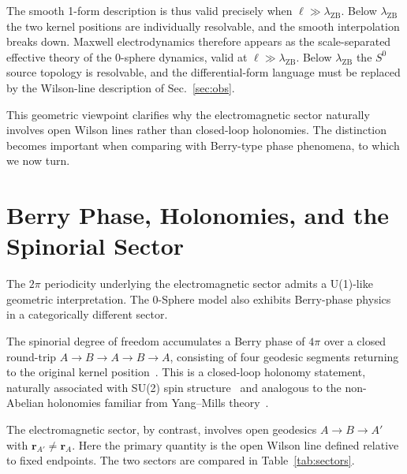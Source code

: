 \documentclass[%
 reprint, amsmath,amssymb, aps, prb, ]{revtex4-2}
\numberwithin{equation}{section}
\begin{document}
The smooth 1-form description is thus valid precisely when $\ell\gg\lambda_{\text{ZB}}$. Below $\lambda_{\text{ZB}}$ the two kernel positions are individually resolvable, and the smooth interpolation breaks down. Maxwell electrodynamics therefore appears as the scale-separated effective theory of the 0-sphere dynamics, valid at $\ell\gg\lambda_{\text{ZB}}$. Below $\lambda_{\text{ZB}}$ the $S^0$ source topology is resolvable, and the differential-form language must be replaced by the Wilson-line description of Sec.~\ref{sec:obs}.

This geometric viewpoint clarifies why the electromagnetic sector naturally involves open Wilson lines rather than closed-loop holonomies. The distinction becomes important when comparing with Berry-type phase phenomena, to which we now turn.

\section{Berry Phase, Holonomies, and the Spinorial Sector}
\label{sec:berry}

The $2\pi$ periodicity underlying the electromagnetic sector admits a U(1)-like geometric interpretation. The 0-Sphere model also exhibits Berry-phase physics~\cite{Berry1984,hanamura26} in a categorically different sector.

The spinorial degree of freedom accumulates a Berry phase of $4\pi$ over a closed round-trip $A\to B\to A\to B\to A$, consisting of four geodesic segments returning to the original kernel position~\cite{hanamura29}. This is a closed-loop holonomy statement, naturally associated with SU(2) spin structure~\cite{hanamura45} and analogous to the non-Abelian holonomies familiar from Yang--Mills theory~\cite{YangMills1954}.

The electromagnetic sector, by contrast, involves open geodesics $A\to B\to A'$ with $\mathbf{r}_{A'}\neq\mathbf{r}_A$. Here the primary quantity is the open Wilson line defined relative to fixed endpoints. The two sectors are compared in Table~\ref{tab:sectors}.
\end{document}
